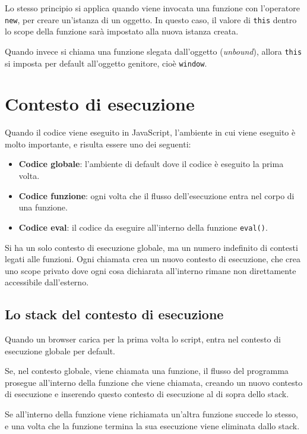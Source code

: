 Lo stesso principio si applica quando viene invocata una funzione con l'operatore \texttt{new}, per creare un'istanza di un oggetto. In questo caso, il valore di \texttt{this} dentro lo scope della funzione sarà impostato alla nuova istanza creata.

Quando invece si chiama una funzione slegata dall'oggetto (\textit{unbound}), allora \texttt{this} si imposta per default all'oggetto genitore, cioè \texttt{window}.

\section{Contesto di esecuzione}

Quando il codice viene eseguito in JavaScript, l'ambiente in cui viene eseguito è molto importante, e risulta essere uno dei seguenti:
\begin{itemize}
    \item \textbf{Codice globale}: l'ambiente di default dove il codice è eseguito la prima volta.
    \item \textbf{Codice funzione}: ogni volta che il flusso dell'esecuzione entra nel corpo di una funzione.
    \item \textbf{Codice eval}: il codice da eseguire all'interno della funzione \texttt{eval()}.
\end{itemize}

Si ha un solo contesto di esecuzione globale, ma un numero indefinito di contesti legati alle funzioni. Ogni chiamata crea un nuovo contesto di esecuzione, che crea uno scope privato dove ogni cosa dichiarata all'interno rimane non direttamente accessibile dall'esterno.

\subsection{Lo stack del contesto di esecuzione}

Quando un browser carica per la prima volta lo script, entra nel contesto di esecuzione globale per default.

Se, nel contesto globale, viene chiamata una funzione, il flusso del programma prosegue all'interno della funzione che viene chiamata, creando un nuovo contesto di esecuzione e inserendo questo contesto di esecuzione al di sopra dello stack.

Se all'interno della funzione viene richiamata un'altra funzione succede lo stesso, e una volta che la funzione termina la sua esecuzione viene eliminata dallo stack.


